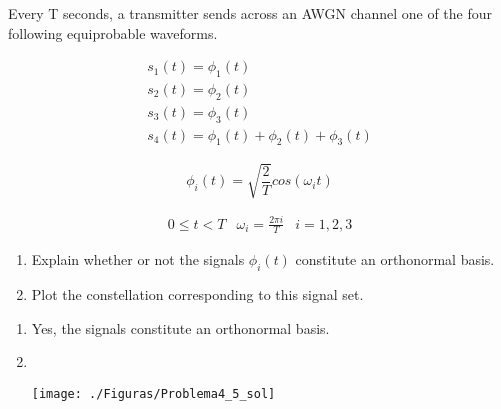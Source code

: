 \documentclass[es,boletin]{uah}
\begin{document}
{

Every T seconds, a transmitter sends across an AWGN channel one of the four following equiprobable waveforms.
	
	\begin{displaymath}
		\begin{array}{l}
			s_1 (t)=\phi_1 (t) \\
			s_2 (t)=\phi_2 (t) \\
			s_3 (t)=\phi_3 (t) \\
			s_4 (t)=\phi_1 (t)+\phi_2 (t)+\phi_3 (t) 
		\end{array}
	\end{displaymath}

	\begin{displaymath}
		\phi_i(t) = \sqrt{\frac{2}{T}} cos(\omega_i t) 
	\end{displaymath}
	
	\begin{displaymath}
		\begin{array}{lll}
			0\leq t<T & \omega_i = \frac{2\pi i}{T} & i=1,2,3
		\end{array}
	\end{displaymath}
	
	\begin{enumerate}
		\item Explain whether or not the signals $\phi_i(t)$ constitute an orthonormal basis.
		\item Plot the constellation corresponding to this signal set.
	\end{enumerate}
}
{
\begin{enumerate}
	\item Yes, the signals constitute an orthonormal basis.
	\item \
	{\begin{figure*}[h!]\centering\texttt{[image: ./Figuras/Problema4\_5\_sol]}\end{figure*}}
\end{enumerate}
}

\newpage
\end{document}
